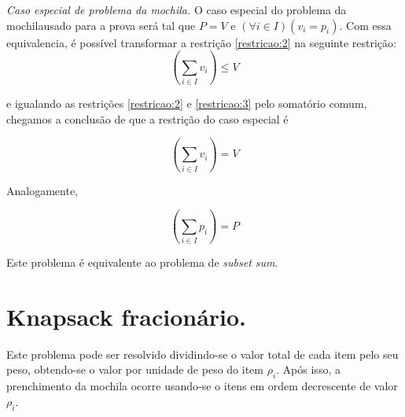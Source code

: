 \documentclass[a4paper]{article}
\newcommand{\ks}{problema da mochila}
\begin{document}
{\it Caso especial de \ks.} O caso especial do \ks usado para a prova será tal que $P = V$ e $(\forall i \in I)(v_i=p_i)$. Com essa equivalencia, é possível transformar a restrição \ref{restricao:2} na seguinte restrição:
\begin{equation}
\label{restricao:3}
\left(\sum_{i \in I} v_i\right) \le V
\end{equation}

e igualando as restrições \ref{restricao:2} e \ref{restricao:3} pelo somatório comum, chegamos a conclusão de que a restrição do caso especial é

\begin{equation}
\label{restricao:especial}
\left(\sum_{i \in I} v_i\right) = V
\end{equation}

Analogamente,

\begin{equation}
\label{restricao:especial_analoga}
\left(\sum_{i \in I} p_i\right) = P
\end{equation}

Este problema é equivalente ao problema de {\it subset sum}.

\section*{Knapsack fracionário.}
Este problema pode ser resolvido dividindo-se o valor total de cada item pelo seu peso, obtendo-se o valor por unidade de peso do item $\rho_i$. Após isso, a prenchimento da mochila ocorre usando-se o itens em ordem decrescente de valor $\rho_i$.
\end{document}
